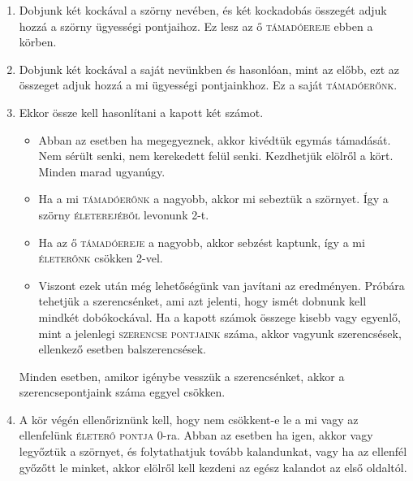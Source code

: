 \documentclass[12pt,a4paper,oneside]{report}
\newcommand{\stat}{\textsc}
\begin{document}
        \begin{enumerate}
          \item Dobjunk két kockával a szörny nevében, és két kockadobás összegét adjuk
            hozzá a szörny ügyességi pontjaihoz. Ez lesz az ő \textsc{támadóereje} ebben a körben.
          \item Dobjunk két kockával a saját nevünkben és hasonlóan, mint az előbb,
            ezt az összeget adjuk hozzá a mi ügyességi pontjainkhoz. Ez a saját
            \textsc{támadóerőnk}.
          \item Ekkor össze kell hasonlítani a kapott két számot.
            \begin{itemize}
              \item Abban az esetben ha megegyeznek, akkor kivédtük egymás
                támadását. Nem sérült senki, nem kerekedett felül senki. Kezdhetjük
                elölről a kört. Minden marad ugyanúgy.
              \item Ha a mi \textsc{támadóerőnk} a nagyobb, akkor mi sebeztük a szörnyet. Így a
                szörny \stat{életerejéből} levonunk 2-t.
              \item Ha az ő \textsc{támadóereje} a nagyobb, akkor sebzést kaptunk, így a mi
                \stat{életerőnk} csökken 2-vel.
              \item Viszont ezek után még lehetőségünk van javítani az
                eredményen. Próbára tehetjük a szerencsénket, ami azt jelenti, hogy
                ismét dobnunk kell mindkét dobókockával. Ha a kapott számok összege
                kisebb vagy egyenlő, mint a jelenlegi \stat{szerencse pontjaink} száma,
                akkor vagyunk szerencsések, ellenkező esetben
                balszerencsések.
            \end{itemize}
            Minden esetben, amikor igénybe vesszük a
            szerencsénket, akkor a szerencsepontjaink száma eggyel csökken.
          \item A kör végén ellenőriznünk kell, hogy nem csökkent-e le a mi vagy az
            ellenfelünk \stat{életerő pontja} 0-ra. Abban az esetben ha igen, akkor vagy
            legyőztük a szörnyet, és folytathatjuk tovább kalandunkat, vagy ha
            az ellenfél győzőtt le minket, akkor elölről kell kezdeni az egész
            kalandot az első oldaltól.
        \end{enumerate} 
\end{document}
